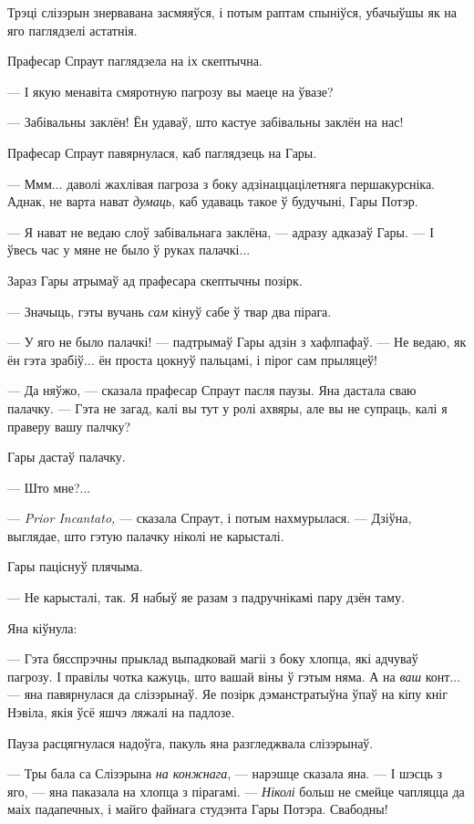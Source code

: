 Трэці слізэрын знервавана засмяяўся, і потым раптам спыніўся, убачыўшы як на яго
паглядзелі астатнія.

Прафесар Спраут паглядзела на іх скептычна. 

--- І якую менавіта смяротную пагрозу вы маеце на ўвазе?

--- Забівальны заклён! Ён удаваў, што кастуе забівальны заклён на нас!

Прафесар Спраут павярнулася, каб паглядзець на Гары.

--- Ммм... даволі жахлівая пагроза з боку адзінаццацілетняга першакурсніка.
Аднак, не варта нават \emph{думаць}, каб удаваць такое ў будучыні, Гары Потэр. 

--- Я нават не ведаю слоў забівальнага заклёна, --- адразу адказаў Гары. ---
І ўвесь час у мяне не было ў руках палачкі...  

Зараз Гары атрымаў ад прафесара скептычны позірк.

--- Значыць, гэты вучань \emph{сам} кінуў сабе ў твар два пірага.

--- У яго не было палачкі! --- падтрымаў Гары адзін з хафлпафаў. --- Не ведаю, 
як ён гэта зрабіў... ён проста цокнуў пальцамі, і пірог сам прыляцеў!

--- Да няўжо, --- сказала прафесар Спраут пасля паузы. Яна дастала сваю палачку. ---
Гэта не загад, калі вы тут у ролі ахвяры, але вы не супраць, калі я 
праверу вашу палчку?

Гары дастаў палачку.

--- Што мне?...

--- \emph{Prior Incantato,} --- сказала Спраут, і потым нахмурылася. --- Дзіўна,
выглядае, што гэтую палачку ніколі не карысталі.

Гары паціснуў плячыма. 

--- Не карысталі, так. Я набыў яе разам з падручнікамі пару дзён таму.

Яна кіўнула:

--- Гэта бясспрэчны прыклад выпадковай магіі з боку хлопца, які адчуваў пагрозу.
І правілы чотка кажуць, што вашай віны ў гэтым няма. А на \emph{ваш} конт... ---
яна павярнулася да слізэрынаў. Яе позірк дэманстратыўна ўпаў на кіпу кніг Нэвіла, 
якія ўсё яшчэ ляжалі на падлозе.

Пауза расцягнулася надоўга, пакуль яна разгледжвала слізэрынаў.

--- Тры бала са Слізэрына \emph{на конжнага}, --- нарэшце сказала яна. --- І шэсць 
з яго, --- яна паказала на хлопца з пірагамі. --- \emph{Ніколі} больш не смейце чапляцца
да маіх падапечных, і майго файнага студэнта Гары Потэра. Свабодны!

